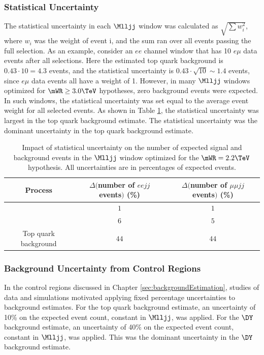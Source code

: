 \subsubsection{Statistical Uncertainty}
\label{sec:statUnc}
The statistical uncertainty in each $\Mlljj$ window was calculated as $\sqrt{\sum w_{i}^{2}}$, where 
$w_{i}$ was the weight of event i, and the sum ran over all events passing the full selection.  As an 
example, consider an $ee$ channel window that has 10 $e\mu$ data events after all selections.  Here 
the estimated top quark background is $0.43 \cdot 10 = 4.3$ events, and the statistical uncertainty is 
$0.43 \cdot \sqrt{10} \sim 1.4$ events, since $e\mu$ data events all have a weight of 1.  However, in 
many $\Mlljj$ windows optimized for $\mWR \geq 3.0\TeV$ hypotheses, zero background events were expected.  
In such windows, the statistical uncertainty was set equal to the average event weight for all selected 
events.  As shown in Table \ref{tab:impactOfStatUncert}, the statistical uncertainty was largest in the 
top quark background estimate.  The statistical uncertainty was the dominant uncertainty in the top 
quark background estimate.

\begin{table}[ht]
	\caption{Impact of statistical uncertainty on the number of expected signal and background events in the $\Mlljj$ 
		window optimized for the $\mWR = 2.2\TeV$ hypothesis.  All uncertainties are in percentages of expected events.}
  \label{tab:impactOfStatUncert}
  \centering
    \begin{tabular}{c|c|c}
		Process & $\Delta($number of $eejj$ events$)$ (\%) & $\Delta($number of $\mu\mu jj$ events$)$ (\%)  \\
      \hline
	  \WR & $1$ & $1$ \\
	  \DY & $6$ & $5$ \\
	 Top quark background & $44$ & $44$  \\
  \hline
  \end{tabular}
\end{table}

\subsubsection{Background Uncertainty from Control Regions}
\label{sec:bkgndNormUnc}
In the control regions discussed in Chapter \ref{sec:backgroundEstimation}, studies of data and 
simulations motivated applying fixed percentage uncertainties to background estimates.  For 
the top quark background estimate, an uncertainty of 10\% on the expected event count, constant 
in $\Mlljj$, was applied.  For the $\DY$ background estimate, an uncertainty of 40\% on the 
expected event count, constant in $\Mlljj$, was applied.  This was the dominant uncertainty in 
the $\DY$ background estimate.

